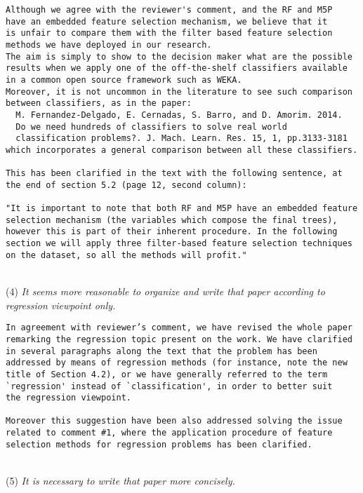 \documentclass[preprint]{elsarticle}
\begin{document}
\begin{verbatim}
Although we agree with the reviewer's comment, and the RF and M5P 
have an embedded feature selection mechanism, we believe that it 
is unfair to compare them with the filter based feature selection 
methods we have deployed in our research. 
The aim is simply to show to the decision maker what are the possible 
results when we apply one of the off-the-shelf classifiers available 
in a common open source framework such as WEKA. 
Moreover, it is not uncommon in the literature to see such comparison 
between classifiers, as in the paper:
  M. Fernandez-Delgado, E. Cernadas, S. Barro, and D. Amorim. 2014. 
  Do we need hundreds of classifiers to solve real world 
  classification problems?. J. Mach. Learn. Res. 15, 1, pp.3133-3181
which incorporates a general comparison between all these classifiers.

This has been clarified in the text with the following sentence, at 
the end of section 5.2 (page 12, second column):

"It is important to note that both RF and M5P have an embedded feature 
selection mechanism (the variables which compose the final trees), 
however this is part of their inherent procedure. In the following 
section we will apply three filter-based feature selection techniques 
on the dataset, so all the methods will profit."
\end{verbatim}


~\\
\noindent (4) \emph{It seems more reasonable to organize and write that paper according to regression viewpoint only. } 

\begin{verbatim}
In agreement with reviewer’s comment, we have revised the whole paper 
remarking the regression topic present on the work. We have clarified 
in several paragraphs along the text that the problem has been 
addressed by means of regression methods (for instance, note the new 
title of Section 4.2), or we have generally referred to the term 
`regression' instead of `classification', in order to better suit 
the regression viewpoint.

Moreover this suggestion have been also addressed solving the issue 
related to comment #1, where the application procedure of feature 
selection methods for regression problems has been clarified. 
\end{verbatim}


~\\
\noindent (5) \emph{It is necessary to write that paper more concisely. } 
\end{document}
